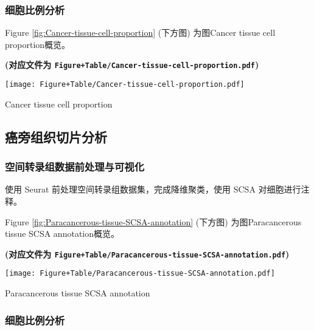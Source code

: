 \documentclass[
]{article}
\begin{document}
\hypertarget{ux7ec6ux80deux6bd4ux4f8bux5206ux6790}{%
\subsubsection{细胞比例分析}\label{ux7ec6ux80deux6bd4ux4f8bux5206ux6790}}

Figure \ref{fig:Cancer-tissue-cell-proportion} (下方图) 为图Cancer tissue cell proportion概览。

\textbf{(对应文件为 \texttt{Figure+Table/Cancer-tissue-cell-proportion.pdf})}

\def\@captype{figure}
\begin{center}
\texttt{[image: Figure+Table/Cancer-tissue-cell-proportion.pdf]}
\caption{Cancer tissue cell proportion}\label{fig:Cancer-tissue-cell-proportion}
\end{center}

\hypertarget{ux764cux65c1ux7ec4ux7ec7ux5207ux7247ux5206ux6790}{%
\subsection{癌旁组织切片分析}\label{ux764cux65c1ux7ec4ux7ec7ux5207ux7247ux5206ux6790}}

\hypertarget{ux7a7aux95f4ux8f6cux5f55ux7ec4ux6570ux636eux524dux5904ux7406ux4e0eux53efux89c6ux5316-1}{%
\subsubsection{空间转录组数据前处理与可视化}\label{ux7a7aux95f4ux8f6cux5f55ux7ec4ux6570ux636eux524dux5904ux7406ux4e0eux53efux89c6ux5316-1}}

使用 Seurat 前处理空间转录组数据集，完成降维聚类，使用 SCSA 对细胞进行注释。

Figure \ref{fig:Paracancerous-tissue-SCSA-annotation} (下方图) 为图Paracancerous tissue SCSA annotation概览。

\textbf{(对应文件为 \texttt{Figure+Table/Paracancerous-tissue-SCSA-annotation.pdf})}

\def\@captype{figure}
\begin{center}
\texttt{[image: Figure+Table/Paracancerous-tissue-SCSA-annotation.pdf]}
\caption{Paracancerous tissue SCSA annotation}\label{fig:Paracancerous-tissue-SCSA-annotation}
\end{center}

\hypertarget{ux7ec6ux80deux6bd4ux4f8bux5206ux6790-1}{%
\subsubsection{细胞比例分析}\label{ux7ec6ux80deux6bd4ux4f8bux5206ux6790-1}}
\end{document}
